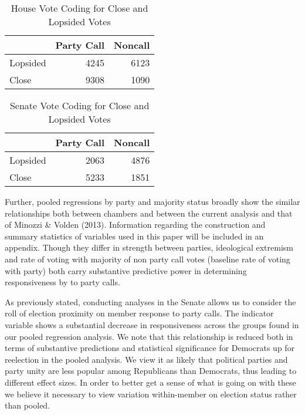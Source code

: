 \documentclass[12pt]{article}
\begin{document}
\begin{table}[H]
	\centering
	\caption{House Vote Coding for Close and Lopsided Votes} 
	\begin{tabular}{lrr}
		\hline
		& Party Call & Noncall \\ 
		\hline
		Lopsided & 4245 & 6123 \\ 
		Close & 9308 & 1090 \\ 
		\hline
	\end{tabular}
\end{table}

\begin{table}[H]
	\centering
	\caption{Senate Vote Coding for Close and Lopsided Votes} 
	\begin{tabular}{lrr}
		\hline
		& Party Call & Noncall \\ 
		\hline
		Lopsided & 2063 & 4876 \\ 
		Close & 5233 & 1851 \\ 
		\hline
	\end{tabular}
\end{table}

Further, pooled regressions by party and majority status broadly show the similar relationships both between chambers and between the current analysis and that of Minozzi \& Volden (2013). Information regarding the construction and summary statistics of variables used in this paper will be included in an appendix. Though they differ in strength between parties, ideological extremism and rate of voting with majority of non party call votes (baseline rate of voting with party) both carry substantive predictive power in determining responsiveness by to party calls. 

As previously stated, conducting analyses in the Senate allows us to consider the roll of election proximity on member response to party calls. The indicator variable shows a substantial decrease in responsiveness across the groups found in our pooled regression analysis. We note that this relationship is reduced both in terms of substantive predictions and statistical significance for Democrats up for reelection in the pooled analysis. We view it as likely that political parties and party unity are less popular among Republicans than Democrats, thus leading to different effect sizes. In order to better get a sense of what is going on with these we believe it necessary to view variation within-member on election status rather than pooled.
\end{document}
